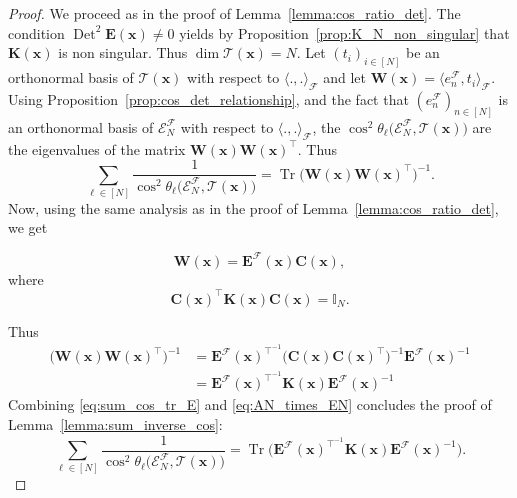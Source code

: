 \documentclass[twoside,11pt]{book}
\numberwithin{theorem}{chapter}
\numberwithin{definition}{chapter}
\numberwithin{proposition}{chapter}
\numberwithin{corollary}{chapter}
\numberwithin{example}{chapter}
\numberwithin{lemma}{chapter}
\numberwithin{assumption}{chapter}
\DeclareMathOperator{\Tr}{Tr}
\DeclareMathOperator{\Det}{Det}
\DeclareMathOperator{\Tran}{\intercal}
\begin{document}
\begin{proof}
We proceed as in the proof of Lemma~\ref{lemma:cos_ratio_det}. 
The condition $\Det^{2} \bm{E}(\bm{x}) \neq 0$ yields by Proposition~\ref{prop:K_N_non_singular} that $\bm{K}(\bm{x})$ is non singular. Thus $\dim \mathcal{T}(\bm{x}) = N$. Let $(t_{i})_{i \in [N]}$ be an orthonormal basis of $\mathcal{T}(\bm{x})$ with respect to $\langle ., . \rangle_{\mathcal{F}}$ and let $\bm{W}(\bm{x}) = \langle e_{n}^{\mathcal{F}}, t_{i} \rangle_{\mathcal{F}}$.
%
Using Proposition~\ref{prop:cos_det_relationship}, and the fact that $(e_{n}^{\mathcal{F}})_{n \in [N]}$ is an orthonormal basis of $\mathcal{E}^{\mathcal{F}}_{N}$ with respect to $\langle ., . \rangle_{\mathcal{F}}$, the $\cos^{2} \theta_{\ell} \bigg(\mathcal{E}^{\mathcal{F}}_{N}, \mathcal{T}(\bm{x}) \bigg)$ are the eigenvalues of the matrix $\bm{W}(\bm{x})\bm{W}(\bm{x})^{\Tran}$. Thus
\begin{equation}\label{eq:sum_cos_tr_E}
\sum\limits_{\ell \in [N]} \frac{1}{\cos^{2} \theta_{\ell} \bigg(\mathcal{E}^{\mathcal{F}}_{N}, \mathcal{T}(\bm{x}) \bigg)} = \Tr \bigg( \bm{W}(\bm{x})\bm{W}(\bm{x})^{\Tran} \bigg)^{-1}.
\end{equation}
Now, using the same analysis as in the proof of Lemma~\ref{lemma:cos_ratio_det}, we get 


\begin{equation}
\bm{W}(\bm{x}) = \bm{E}^{\mathcal{F}}(\bm{x})\bm{C}(\bm{x}) ,
\end{equation}
where
\begin{equation}
\bm{C}(\bm{x})^{\Tran} \bm{K}(\bm{x}) \bm{C}(\bm{x}) = \mathbb{I}_{N}.
\end{equation}

%
Thus
\begin{align}\label{eq:AN_times_EN}
\bigg( \bm{W}(\bm{x})\bm{W}(\bm{x})^{\Tran} \bigg)^{-1} & = \bm{E}^{\mathcal{F}}(\bm{x})^{\Tran^{-1}} \bigg( \bm{C}(\bm{x})\bm{C}(\bm{x})^{\Tran} \bigg)^{-1}  \bm{E}^{\mathcal{F}}(\bm{x})^{-1} \nonumber \\
& = \bm{E}^{\mathcal{F}}(\bm{x})^{\Tran^{-1}} \bm{K}(\bm{x}) \bm{E}^{\mathcal{F}}(\bm{x})^{-1}
\end{align}
Combining \eqref{eq:sum_cos_tr_E} and \eqref{eq:AN_times_EN} concludes the proof of Lemma~\ref{lemma:sum_inverse_cos}:
\begin{equation}
\sum\limits_{\ell \in [N]} \frac{1}{\cos^{2} \theta_{\ell} \bigg(\mathcal{E}^{\mathcal{F}}_{N}, \mathcal{T}(\bm{x}) \bigg)} = \Tr \bigg(\bm{E}^{\mathcal{F}}(\bm{x})^{\Tran^{-1}} \bm{K}(\bm{x})  \bm{E}^{\mathcal{F}}(\bm{x})^{-1} \bigg).
\end{equation}
\end{proof}
\end{document}
